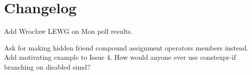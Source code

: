\section{Changelog}
\begin{revision}
\item Add Wrocław LEWG on Mon poll results.
\item Ask for making hidden friend compound assignment operators members instead.
\todo Add motivating example to Issue 4. How would anyone ever use constexpr-if
branching on disabled simd?
\end{revision}
